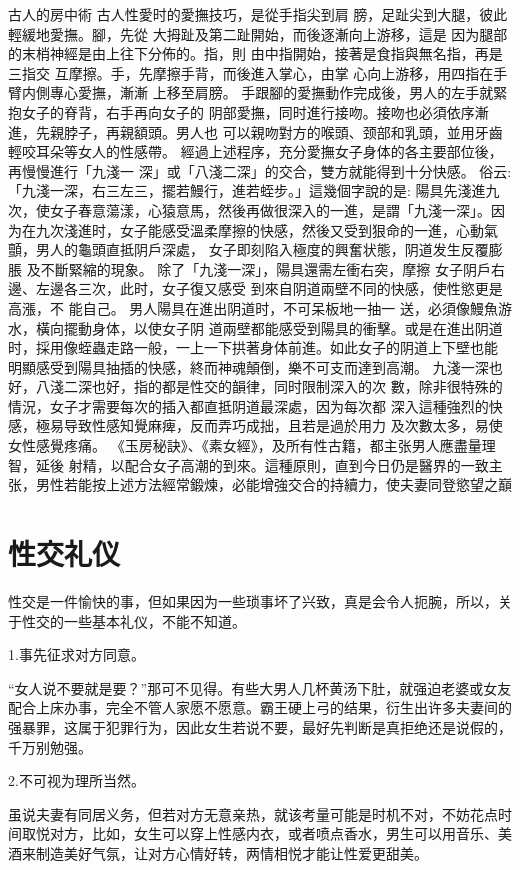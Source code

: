 \documentclass[12pt,UTF8]{ctexbook}
\begin{document}
古人的房中術
古人性愛时的愛撫技巧，是從手指尖到肩
膀，足趾尖到大腿，彼此輕緩地愛撫。腳，先從
大拇趾及第二趾開始，而後逐漸向上游移，這是
因为腿部的末梢神經是由上往下分佈的。指，則
由中指開始，接著是食指與無名指，再是三指交
互摩擦。手，先摩擦手背，而後進入掌心，由掌
心向上游移，用四指在手臂内側專心愛撫，漸漸
上移至肩膀。
手跟腳的愛撫動作完成後，男人的左手就緊抱女子的脊背，右手再向女子的
阴部愛撫，同时進行接吻。接吻也必須依序漸進，先親脖子，再親額頭。男人也
可以親吻對方的喉頭、颈部和乳頭，並用牙齒輕咬耳朵等女人的性感帶。
經過上述程序，充分愛撫女子身体的各主要部位後，再慢慢進行「九淺一
深」或「八淺二深」的交合，雙方就能得到十分快感。
俗云:「九淺一深，右三左三，擺若鰻行，進若蛭步。」這幾個字說的是:
陽具先淺進九次，使女子春意蕩漾，心猿意馬，然後再做很深入的一進，是謂「九淺一深」。因为在九次淺進时，女子能感受溫柔摩擦的快感，然後又受到狠命的一進，心動氣顫，男人的龜頭直抵阴戶深處，
女子即刻陷入極度的興奮状態，阴道发生反覆膨脹
及不斷緊縮的現象。
除了「九淺一深」，陽具還需左衝右突，摩擦
女子阴戶右邊、左邊各三次，此时，女子復又感受
到來自阴道兩壁不同的快感，使性慾更是高漲，不
能自己。
男人陽具在進出阴道时，不可呆板地一抽一
送，必須像鰻魚游水，橫向擺動身体，以使女子阴
道兩壁都能感受到陽具的衝擊。或是在進出阴道
时，採用像蛭蟲走路一般，一上一下拱著身体前進。如此女子的阴道上下壁也能
明顯感受到陽具抽插的快感，終而神魂顛倒，樂不可支而達到高潮。
九淺一深也好，八淺二深也好，指的都是性交的韻律，同时限制深入的次
數，除非很特殊的情況，女子才需要每次的插入都直抵阴道最深處，因为每次都
深入這種強烈的快感，極易导致性感知覺麻痺，反而弄巧成拙，且若是過於用力
及次數太多，易使女性感覺疼痛。
《玉房秘訣》、《素女經》，及所有性古籍，都主张男人應盡量理智，延後
射精，以配合女子高潮的到來。這種原則，直到今日仍是醫界的一致主张，男性若能按上述方法經常鍛煉，必能增強交合的持續力，使夫妻同登慾望之巔

\chapter{性交礼仪}

性交是一件愉快的事，但如果因为一些琐事坏了兴致，真是会令人扼腕，所以，关于性交的一些基本礼仪，不能不知道。

1.事先征求对方同意。

“女人说不要就是要？”那可不见得。有些大男人几杯黄汤下肚，就强迫老婆或女友配合上床办事，完全不管人家愿不愿意。霸王硬上弓的结果，衍生出许多夫妻间的强暴罪，这属于犯罪行为，因此女生若说不要，最好先判断是真拒绝还是说假的，千万别勉强。

2.不可视为理所当然。

虽说夫妻有同居义务，但若对方无意亲热，就该考量可能是时机不对，不妨花点时间取悦对方，比如，女生可以穿上性感内衣，或者喷点香水，男生可以用音乐、美酒来制造美好气氛，让对方心情好转，两情相悦才能让性爱更甜美。
\end{document}
